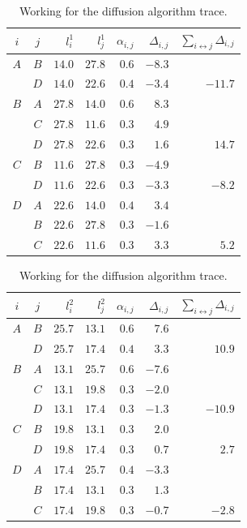 \documentclass{article}
\numberwithin{equation}{section}
\numberwithin{table}{section}
\numberwithin{figure}{section}
\begin{document}
\begin{table}[p]
    \begin{subtable}{\linewidth}
    \centering%
    \begin{tabular}{cc|rrrrr}
        $i$ & $j$ & $l_i^1$ & $l_j^1$ & $\alpha_{i,j}$ &
            $\Delta_{i,j}$ & $\sum_{i\leftrightarrow j} \Delta_{i,j}$ \\
        \toprule
        $A$&$B$&$14.0$&$27.8$&$0.6$&$-8.3$& \\
        &$D$&$14.0$&$22.6$&$0.4$&$-3.4$&$-11.7$\\
        \midrule
        $B$&$A$&$27.8$&$14.0$&$0.6$&$8.3$& \\
        &$C$&$27.8$&$11.6$&$0.3$&$4.9$& \\
        &$D$&$27.8$&$22.6$&$0.3$&$1.6$&$14.7$\\
        \midrule
        $C$&$B$&$11.6$&$27.8$&$0.3$&$-4.9$& \\
        &$D$&$11.6$&$22.6$&$0.3$&$-3.3$&$-8.2$\\
        \midrule
        $D$&$A$&$22.6$&$14.0$&$0.4$&$3.4$& \\
        &$B$&$22.6$&$27.8$&$0.3$&$-1.6$& \\
        &$C$&$22.6$&$11.6$&$0.3$&$3.3$&$5.2$ \\
        \bottomrule
    \end{tabular}
    \caption{Working for $k=1 \to k=2$.}%
    \label{table:diffusion-working-2}
    \end{subtable}

    \begin{subtable}{\linewidth}
    \centering%
    \begin{tabular}{cc|rrrrr}
        $i$ & $j$ & $l_i^2$ & $l_j^2$ & $\alpha_{i,j}$ &
            $\Delta_{i,j}$ & $\sum_{i\leftrightarrow j} \Delta_{i,j}$ \\
        \toprule
        $A$&$B$&$25.7$&$13.1$&$0.6$&$7.6$& \\
        &$D$&$25.7$&$17.4$&$0.4$&$3.3$&$10.9$\\
        \midrule
        $B$&$A$&$13.1$&$25.7$&$0.6$&$-7.6$& \\
        &$C$&$13.1$&$19.8$&$0.3$&$-2.0$& \\
        &$D$&$13.1$&$17.4$&$0.3$&$-1.3$&$-10.9$\\
        \midrule
        $C$&$B$&$19.8$&$13.1$&$0.3$&$2.0$& \\
        &$D$&$19.8$&$17.4$&$0.3$&$0.7$&$2.7$\\
        \midrule
        $D$&$A$&$17.4$&$25.7$&$0.4$&$-3.3$& \\
        &$B$&$17.4$&$13.1$&$0.3$&$1.3$& \\
        &$C$&$17.4$&$19.8$&$0.3$&$-0.7$&$-2.8$ \\
        \bottomrule
    \end{tabular}
    \caption{Working for $k=2 \to k=3$.}%
    \label{table:diffusion-working-3}
    \end{subtable}
    \caption{Working for the diffusion algorithm trace.}
\end{table}
\end{document}
